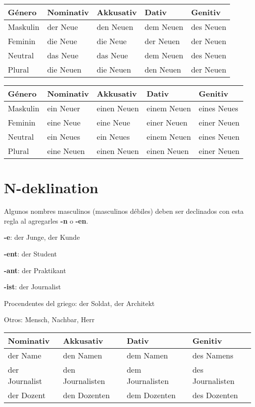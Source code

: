 \begin{tabular}{| l | l | l | l | l |}
\hline
\textbf{Género} & \textbf{Nominativ} & \textbf{Akkusativ} & \textbf{Dativ} & \textbf{Genitiv}\\
\hline
Maskulin & der Neue  & den Neuen & dem Neuen & des Neuen \\
Feminin  & die Neue  & die Neue  & der Neuen & der Neuen \\
Neutral  & das Neue  & das Neue  & dem Neuen & des Neuen \\
Plural   & die Neuen & die Neuen & den Neuen & der Neuen \\
\hline
\end{tabular}

\begin{tabular}{| l | l | l | l | l |}
\hline
\textbf{Género} & \textbf{Nominativ} & \textbf{Akkusativ} & \textbf{Dativ} & \textbf{Genitiv}\\
\hline
Maskulin & ein Neuer  &  einen Neuen & einem Neuen & eines Neues \\
Feminin  & eine Neue  &  eine Neue   & einer Neuen & einer Neuen \\
Neutral  & ein Neues  &  ein Neues   & einem Neuen & eines Neuen \\
Plural   & eine Neuen &  einen Neuen & einen Neuen & einer Neuen \\
\hline
\end{tabular}

\section{N-deklination}

Algunos nombres masculinos (masculinos débiles) deben ser declinados con esta regla al agregarles \textbf{-n} o \textbf{-en}.
\begin{myitemize}
\item \textbf{-e}: der Junge, der Kunde
\item \textbf{-ent}: der Student
\item \textbf{-ant}: der Praktikant
\item \textbf{-ist}: der Journalist
\item Procendentes del griego: der Soldat, der Architekt
\item Otros: Mensch, Nachbar, Herr
\end{myitemize}

\begin{tabular}{| l | l | l | l |}
\hline
\textbf{Nominativ} & \textbf{Akkusativ} & \textbf{Dativ} & \textbf{Genitiv}\\
\hline
der Name & den Namen & dem Namen & des Namens \\
der Journalist & den Journalisten & dem Journalisten  & des Journalisten \\
der Dozent & den Dozenten & dem Dozenten & des Dozenten \\
\hline
\end{tabular}

